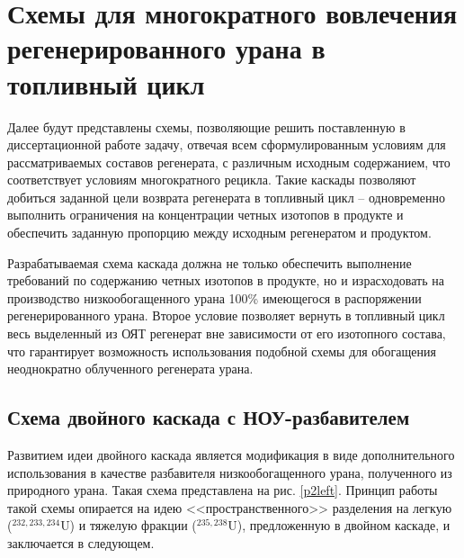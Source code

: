 \chapter{Схемы для многократного вовлечения регенерированного урана в топливный цикл}\label{ch:ch3}

Далее будут представлены схемы, позволяющие решить поставленную в диссертационной работе задачу, отвечая всем сформулированным условиям для рассматриваемых составов регенерата, с различным исходным содержанием, что соответствует условиям многократного рецикла. Такие каскады позволяют добиться заданной цели возврата регенерата в топливный цикл -- одновременно выполнить ограничения на концентрации четных изотопов в продукте и обеспечить заданную пропорцию между исходным регенератом и продуктом.

Разрабатываемая схема каскада должна не только обеспечить выполнение требований по содержанию четных изотопов в продукте, но и израсходовать на производство низкообогащенного урана 100\% имеющегося в распоряжении регенерированного урана. Второе условие позволяет вернуть в топливный цикл весь выделенный из ОЯТ регенерат вне зависимости от его изотопного состава, что гарантирует возможность использования подобной схемы для обогащения неоднократно облученного регенерата урана.

\section{Схема двойного каскада с НОУ-разбавителем}

Развитием идеи двойного каскада является модификация в виде дополнительного использования в качестве разбавителя низкообогащенного урана, полученного из природного урана. Такая схема представлена на рис. \ref{p2left}. Принцип работы такой схемы опирается на идею <<пространственного>> разделения на легкую ($^{232,233,234}$U) и тяжелую фракции ($^{235,238}$U), предложенную в двойном каскаде, и заключается в следующем. 

